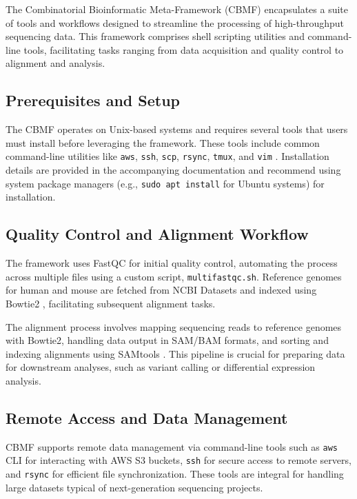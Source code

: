 \documentclass[unnumsec,webpdf,contemporary,large]{oup-authoring-template}
\theoremstyle{thmstyleone}%
\theoremstyle{thmstyletwo}%
\theoremstyle{thmstylethree}%
\begin{document}
The Combinatorial Bioinformatic Meta-Framework (CBMF) encapsulates a suite of tools and workflows designed to streamline the processing of high-throughput sequencing data. This framework comprises shell scripting utilities and command-line tools, facilitating tasks ranging from data acquisition and quality control to alignment and analysis.

\subsection{Prerequisites and Setup}

The CBMF operates on Unix-based systems and requires several tools that users must install before leveraging the framework. These tools include common command-line utilities like \texttt{aws}, \texttt{ssh}, \texttt{scp}, \texttt{rsync}, \texttt{tmux}, and \texttt{vim} \citep{Langmead2012}. Installation details are provided in the accompanying documentation and recommend using system package managers (e.g., \texttt{sudo apt install} for Ubuntu systems) for installation.

\subsection{Quality Control and Alignment Workflow}

The framework uses FastQC \citep{Andrews2010FastQC} for initial quality control, automating the process across multiple files using a custom script, \texttt{multifastqc.sh}. Reference genomes for human and mouse are fetched from NCBI Datasets \citep{Giancarlo2014} and indexed using Bowtie2 \citep{Langmead2012}, facilitating subsequent alignment tasks.

The alignment process involves mapping sequencing reads to reference genomes with Bowtie2, handling data output in SAM/BAM formats, and sorting and indexing alignments using SAMtools \citep{Li2009}. This pipeline is crucial for preparing data for downstream analyses, such as variant calling or differential expression analysis.

\subsection{Remote Access and Data Management}

CBMF supports remote data management via command-line tools such as \texttt{aws} CLI for interacting with AWS S3 buckets, \texttt{ssh} for secure access to remote servers, and \texttt{rsync} for efficient file synchronization. These tools are integral for handling large datasets typical of next-generation sequencing projects.
\end{document}
